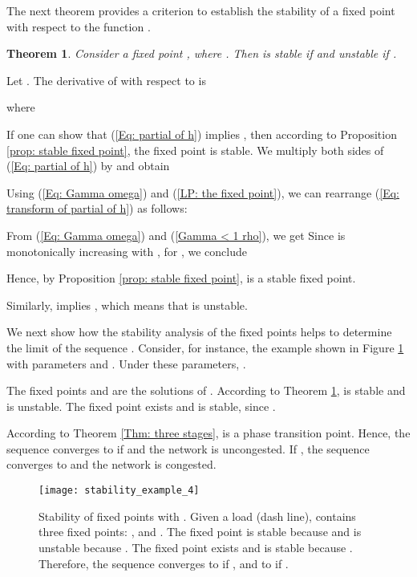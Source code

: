 \documentclass{IEEEtran}
\newtheorem{theorem}{Theorem}
\begin{document}
The next theorem provides a criterion to establish the stability of a fixed point  with respect to the function .
\begin{theorem} \label{stability}
Consider a fixed point , where . Then  is stable if  and unstable if .
\end{theorem}
\begin{IEEEproof}
Let . The derivative of  with respect to  is

where

If one can show that (\ref{Eq: partial of h}) implies , then according to Proposition \ref{prop: stable fixed point}, the fixed
point  is stable. We multiply both sides of (\ref{Eq: partial of h}) by  and obtain

Using (\ref{Eq: Gamma omega}) and (\ref{LP: the fixed point}), we can rearrange (\ref{Eq: transform of partial of h}) as follows:

From (\ref{Eq: Gamma omega}) and (\ref{Gamma < 1 rho}), we get 
Since  is monotonically increasing with , for , we conclude

Hence, by Proposition \ref{prop: stable fixed point},  is a stable fixed point.

Similarly,  implies , which means that  is unstable.

\end{IEEEproof}


We next show how the stability analysis of the fixed points helps to determine the limit of the sequence . Consider, for
instance, the example shown in Figure \ref{stability example} with parameters  and . Under these parameters, .

The fixed points  and  are the solutions of . According to Theorem \ref{stability},  is stable and
 is unstable. The fixed point  exists and is stable, since .

According to Theorem \ref{Thm: three stages},  is a phase transition point. Hence, the sequence  converges to
 if  and the network is uncongested. If , the sequence converges to  and the network is
congested.

\begin{figure}[!t]
\centering
\texttt{[image: stability\_example\_4]}
\caption{Stability of fixed points with . Given a load  (dash line),  contains three fixed points: ,
 and . The fixed point  is stable because  and  is unstable because
. The fixed point  exists and is stable because . Therefore, the sequence 
converges to  if , and to  if .}
\label{stability example}
\end{figure}
\end{document}
